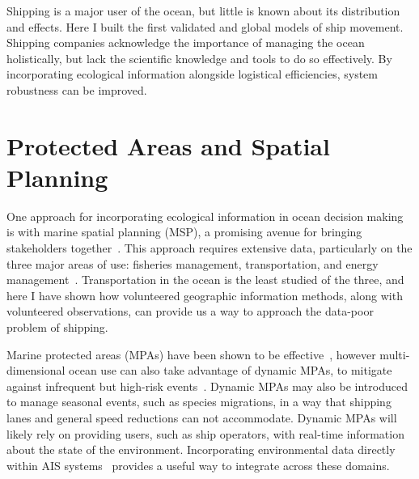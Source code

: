 
Shipping is a major user of the ocean, but little is known about its distribution and effects. Here I built the first validated and global models of ship movement. Shipping companies acknowledge the importance of managing the ocean holistically, but lack the scientific knowledge and tools to do so effectively. By incorporating ecological information alongside logistical efficiencies, system robustness can be improved.

\section{Protected Areas and Spatial Planning}

One approach for incorporating ecological information in ocean decision making is with marine spatial planning (MSP), a promising avenue for bringing stakeholders together~\citep{merrifield2012marinemap}. This approach requires extensive data, particularly on the three major areas of use: fisheries management, transportation, and energy management~\citep{Lubchenco2010}. Transportation in the ocean is the least studied of the three, and here I have shown how volunteered geographic information methods, along with volunteered observations, can provide us a way to approach the data-poor problem of shipping.

Marine protected areas (MPAs) have been shown to be effective~\citep{halpern2002marine}, however multi-dimensional ocean use can also take advantage of dynamic MPAs, to mitigate against infrequent but high-risk events~\citep{Boersma1999}. Dynamic MPAs may also be introduced to manage seasonal events, such as species migrations, in a way that shipping lanes and general speed reductions can not accommodate. %
Dynamic MPAs will likely rely on providing users, such as ship operators, with real-time information about the state of the environment. Incorporating environmental data directly within AIS systems~\citep{2011AGUFMIN11B1278S} provides a useful way to integrate across these domains.

